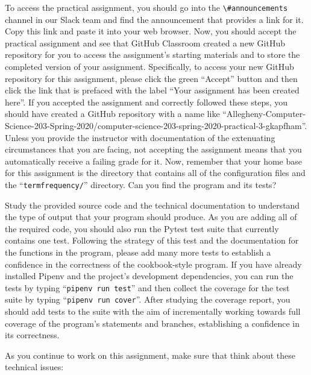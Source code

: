 \documentclass[11pt]{article}
\newcommand{\command}[1]{``\lstinline{#1}''}
\newcommand{\channel}[1]{\lstinline{#1}}
\begin{document}
To access the practical assignment, you should go into the
\channel{\#announcements} channel in our Slack team and find the announcement
that provides a link for it. Copy this link and paste it into your web browser.
Now, you should accept the practical assignment and see that GitHub Classroom
created a new GitHub repository for you to access the assignment's starting
materials and to store the completed version of your assignment. Specifically,
to access your new GitHub repository for this assignment, please click the green
``Accept'' button and then click the link that is prefaced with the label ``Your
assignment has been created here''. If you accepted the assignment and correctly
followed these steps, you should have created a GitHub repository with a name
like
``Allegheny-Computer-Science-203-Spring-2020/computer-science-203-spring-2020-practical-3-gkapfham''.
Unless you provide the instructor with documentation of the extenuating
circumstances that you are facing, not accepting the assignment means that you
automatically receive a failing grade for it. Now, remember that your home base
for this assignment is the directory that contains all of the configuration
files and the \command{termfrequency/} directory. Can you find the program and
its tests?

Study the provided source code and the technical documentation to understand the
type of output that your program should produce.
%
As you are adding all of the required code, you should also run the Pytest test
suite that currently contains one test. Following the strategy of this test and
the documentation for the functions in the program, please add many more tests
to establish a confidence in the correctness of the cookbook-style program.
%
If you have already installed Pipenv and the project's development dependencies,
you can run the tests by typing \command{pipenv run test} and then collect the
coverage for the test suite by typing \command{pipenv run cover}.
%
After studying the coverage report, you should add tests to the suite with the
aim of incrementally working towards full coverage of the program's statements
and branches, establishing a confidence in its correctness.

\noindent As you continue to work on this assignment, make sure that think about
these technical issues:

\vspace*{-.1in}
\end{document}
